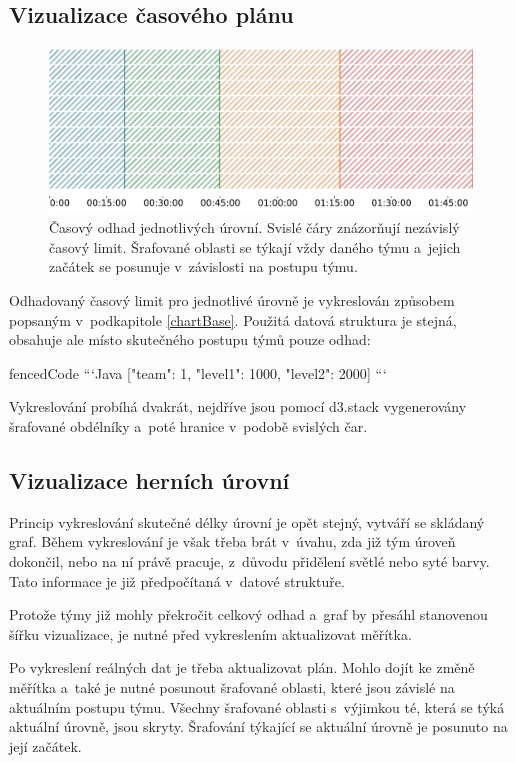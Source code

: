 \documentclass[
  digital, %
  oneside, %
  table,   %
  nolof,     %
  nolot,     %
  nocover
]{fithesis3}
\begin{document}
\subsection{Vizualizace časového plánu}
\begin{figure}[H]
  \begin{center}
    \includegraphics[width=12.7cm]{images/ctf-plan.pdf}
  \end{center}
  \caption{Časový odhad jednotlivých úrovní. Svislé čáry znázorňují nezávislý časový limit. Šrafované oblasti se týkají vždy daného týmu a~jejich začátek se posunuje v~závislosti na postupu týmu.}
  \label{fig:visualizationChart}
\end{figure}
Odhadovaný časový limit pro jednotlivé úrovně je vykreslován způsobem popsaným v~podkapitole \ref{chartBase}. Použitá datová struktura je stejná, obsahuje ale místo skutečného postupu týmů pouze odhad:
\begin{markdown*}{
  fencedCode
}
```Java
[{"team": 1, "level1": 1000, "level2": 2000}]
```
\end{markdown*}
Vykreslování probíhá dvakrát, nejdříve jsou pomocí d3.stack vygenerovány šrafované obdélníky a~poté hranice v~podobě svislých čar.

\subsection{Vizualizace herních úrovní}
Princip vykreslování skutečné délky úrovní je opět stejný, vytváří se skládaný graf. Během vykreslování je však třeba brát v~úvahu, zda již tým úroveň dokončil, nebo na ní právě pracuje, z~důvodu přidělení světlé nebo syté barvy. Tato informace je již předpočítaná v~datové struktuře.\par
Protože týmy již mohly překročit celkový odhad a~graf by přesáhl stanovenou šířku vizualizace, je nutné před vykreslením aktualizovat měřítka.\par
Po vykreslení reálných dat je třeba aktualizovat plán. Mohlo dojít ke změně měřítka a~také je nutné posunout šrafované oblasti, které jsou závislé na aktuálním postupu týmu. Všechny šrafované oblasti s~výjimkou té, která se týká aktuální úrovně, jsou skryty. Šrafování týkající se aktuální úrovně je posunuto na její začátek.
\end{document}
